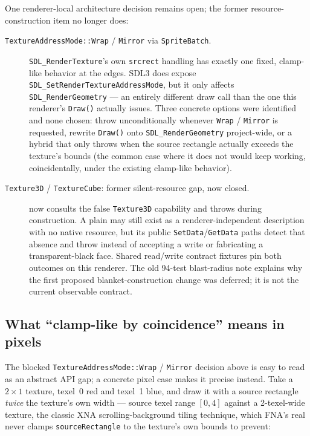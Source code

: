 One renderer-local architecture decision remains open; the former resource-construction item no
longer does:

\begin{description}
  \item[\texttt{TextureAddressMode::Wrap} / \texttt{Mirror} via \texttt{SpriteBatch}.]
        \texttt{SDL\_RenderTexture}'s own \texttt{srcrect} handling has exactly one fixed,
        clamp-like behavior at the edges. SDL3 does expose
        \texttt{SDL\_SetRenderTextureAddressMode}, but it only affects
        \texttt{SDL\_RenderGeometry} --- an entirely different draw call than the one this
        renderer's \texttt{Draw()} actually issues. Three concrete options were identified and
        none chosen: throw unconditionally whenever \texttt{Wrap} / \texttt{Mirror} is
        requested, rewrite \texttt{Draw()} onto \texttt{SDL\_RenderGeometry} project-wide, or
        a hybrid that only throws when the source rectangle actually exceeds the texture's
        bounds (the common case where it does not would keep working, coincidentally, under
        the existing clamp-like behavior).
  \item[\texttt{Texture3D} / \texttt{TextureCube}: former silent-resource gap, now closed.]
         now consults the false \texttt{Texture3D} capability and throws
         during construction. A plain 
        may still exist as a renderer-independent description with no native resource, but its
        public \texttt{SetData}/\texttt{GetData} paths detect that absence and throw instead of
        accepting a write or fabricating a transparent-black face. Shared read/write contract
        fixtures pin both outcomes on this renderer. The old 94-test blast-radius note explains
        why the first proposed blanket-construction change was deferred; it is not the current
        observable contract.
\end{description}

\subsection{What ``clamp-like by coincidence'' means in pixels}

The blocked \texttt{TextureAddressMode::Wrap} / \texttt{Mirror} decision above is easy to read
as an abstract API gap; a concrete pixel case makes it precise instead. Take a $2\times1$
texture, texel~0 red and texel~1 blue, and draw it with a source rectangle \emph{twice} the
texture's own width --- source texel range $[0,4]$ against a 2-texel-wide texture, the classic
XNA scrolling-background tiling technique, which FNA's real  never clamps
\texttt{sourceRectangle} to the texture's own bounds to prevent:

